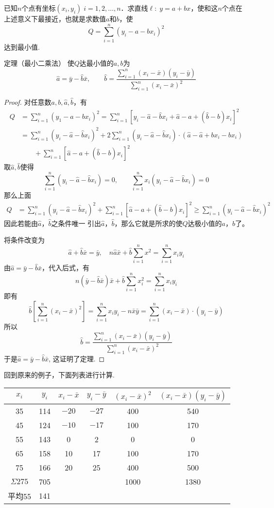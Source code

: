 已知$n$个点有坐标$(x_i,y_i)\; i=1,2,\ldots,n$．求直线$\ell:\; y=a+bx$，使和这$n$个点在上述意义下最接近，也就是求数值$a$和$b$，使
\[Q=\sum^n_{i=1}(y_i-a-bx_i)^2\]
达到最小值.

\begin{blk}{定理（最小二乘法）}
使$Q$达最小值的$a,b$为
\[\hat a=\bar y-\hat b \bar x,\qquad \hat b=\frac{\sum\limits^n_{i=1}(x_i-\bar x)(y_i-\bar y)}{\sum\limits^n_{i=1}(x_i-\bar x)^2}\]
\end{blk}

\begin{proof}
对任意数$a,b,\hat a,\hat b$，有
\[\begin{split}
Q&=\sum^n_{i=1}(y_1-a-bx_i)^2 =\sum^n_{i=1}\left[y_i-\hat a-\hat b x_i+\hat a-a+(\hat b-b)x_i\right]^2\\ 
&=\sum^n_{i=1}\left(y_i-\hat a-\hat b x_i\right)^2+2\sum^n_{i=1}\left(y_i-\hat a-\hat b x_i\right)\cdot \left(\hat a-\hat a+bx_i-bx_i\right)\\
&\qquad +\sum^n_{i=1}\left[\hat a-a+(\hat b-b)x_i\right]^2
\end{split}\]
取$\hat a,\hat b$使得
\[\sum^n_{i=1}\left(y_i-\hat a-\hat b x_i\right)=0,\qquad \sum^n_{i=1}x_i\left(y_i-\hat a-\hat b x_i\right)=0\]
那么上面
\[\begin{split}
    Q&=\sum^n_{i=1}\left(y_i-\hat a-\hat b x_i\right)^2+\sum^n_{i=1}\left[\hat a-a+(\hat b-b)x_i\right]^2\ge \sum^n_{i=1}\left(y_i-\hat a-\hat b x_i\right)^2
\end{split}\]
因此若能由$\hat a$，$\hat b$之条件唯一
引出$\hat a$，$\hat b$，那么它就是所求的使$Q$达极小值的$a$，$b$了。

将条件改变为
\[\hat a+\hat b \bar x=\bar y,\quad n\hat a \bar x+\hat b\sum^n_{i=1}x^2=\sum^n_{i=1}x_iy_i\]
由$\hat a=\bar y-\hat b\bar x$，代入后式，有
\[n\left(\bar y-\hat b\bar x\right)\bar x+\hat b\sum^n_{i=1}x^2_i=\sum^n_{i=1}x_iy_i\]
即有
\[\hat b\left[\sum^n_{i=1}(x_i-\bar x)^2\right]=\sum^n_{i=1}x_iy_i-n\bar x\bar y=\sum^n_{i=1}(x_i-\bar x)\cdot (y_i-\bar y)\]
所以\[\hat b=\frac{\sum\limits^n_{i=1}(x_i-\bar x)(y_i-\bar y)}{\sum\limits^n_{i=1}(x_i-\bar x)^2}\]
于是$\hat a=\bar y-\hat b\bar x$, 这证明了定理.
\end{proof}

回到原来的例子，下面列表进行计算.
\begin{center}
\begin{tabular}{cccccc}
\hline
$x_i$ & $y_i$&$x_i-\bar x$&$y_i-\bar y$&$(x_i-\bar x)^2$&$(x_i-\bar x)(y_i-\bar y)$\\
\hline
35&114&$-20$&$-27$&400&540\\
45&124&$-10$&$-17$&100&170\\
55&143&0&2&0&0\\
65&158&10&17&100&170\\
75&166&20&25&400&500\\
\hline
$\Sigma 275$&705&&&1000&1380\\
平均55&141\\
\hline
\end{tabular}
\end{center}

